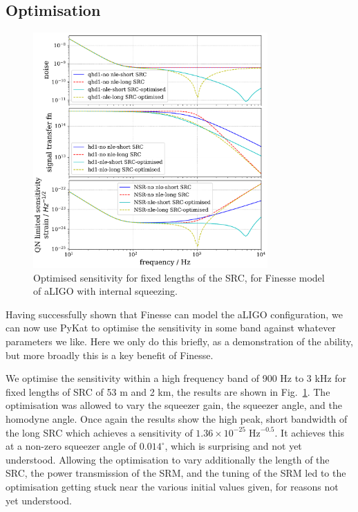 \documentclass[aps,pra,superscriptaddress,reprint,nofootinbib]{revtex4-1}
\begin{document}
\subsection{Optimisation}

\begin{figure}
	\begin{center}
	\includegraphics[width=0.8\textwidth]{figures/aLIGO_optimum_sensitivity_comparison.pdf}
	\end{center}
	\caption{Optimised sensitivity for fixed lengths of the SRC, for Finesse model of aLIGO with internal squeezing.}
	\label{fig:aLIGO_optimum_sensitivity_comparison}
\end{figure}

Having successfully shown that Finesse can model the aLIGO configuration, we can now use PyKat to optimise the sensitivity in some band against whatever parameters we like. Here we only do this briefly, as a demonstration of the ability, but more broadly this is a key benefit of Finesse.


We optimise the sensitivity within a high frequency band of 900 Hz to 3 kHz for fixed lengths of SRC of 53 m and 2 km, the results are shown in Fig.~\ref{fig:aLIGO_optimum_sensitivity_comparison}. The optimisation was allowed to vary the squeezer gain, the squeezer angle, and the homodyne angle. Once again the results show the high peak, short bandwidth of the long SRC which achieves a sensitivity of $1.36 \times 10^{-25}\; \mathrm{Hz}^{-0.5}$. It achieves this at a non-zero squeezer angle of $0.014^\circ$, which is surprising and not yet understood. Allowing the optimisation to vary additionally the length of the SRC, the power transmission of the SRM, and the tuning of the SRM led to the optimisation getting stuck near the various initial values given, for reasons not yet understood.
\end{document}
